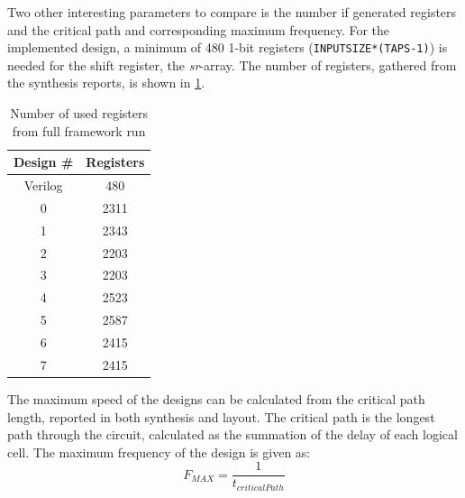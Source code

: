 Two other interesting parameters to compare is the number if generated registers and the critical path and corresponding maximum frequency. For the implemented design, a minimum of 480 1-bit registers (\verb!INPUTSIZE*(TAPS-1)!) is needed for the shift register, the \textit{sr}-array. The number of registers, gathered from the synthesis reports, is shown in \cref{tab:resultregistercount}. 

\begin{table}[hbtp]
    \centering
    \begin{tabular}{cc}
    \textbf{Design \#} & \textbf{Registers} \\
    \toprule
    Verilog & 480 \\
    0 & 2311 \\
    1 & 2343 \\
    2 & 2203 \\
    3 & 2203 \\
    4 & 2523 \\
    5 & 2587 \\
    6 & 2415 \\
    7 & 2415 \\
    \bottomrule
    \end{tabular}
    \caption{Number of used registers from full framework run}
    \label{tab:resultregistercount}
\end{table}
The maximum speed of the designs can be calculated from the critical path length, reported in both synthesis and layout. The critical path is the longest path through the circuit, calculated as the summation of the delay of each logical cell. The maximum frequency of the design is given as:
\begin{equation}
   F_{MAX} = \frac{1}{t_{criticalPath}}
\end{equation}


